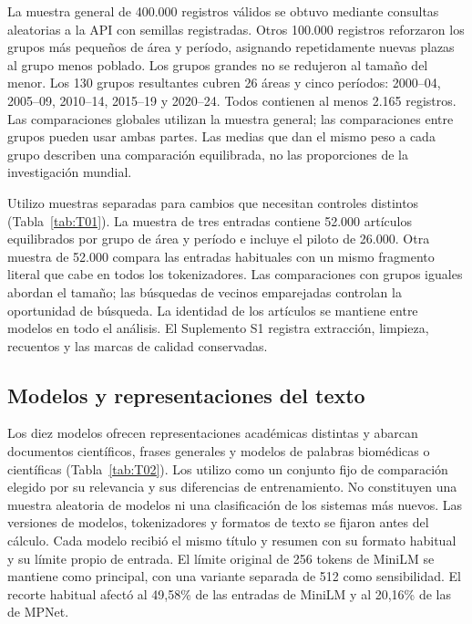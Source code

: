 \documentclass[12pt]{article}
\begin{document}
La muestra general de 400.000 registros válidos se obtuvo mediante consultas aleatorias a la API con semillas registradas. Otros 100.000 registros reforzaron los grupos más pequeños de área y período, asignando repetidamente nuevas plazas al grupo menos poblado. Los grupos grandes no se redujeron al tamaño del menor. Los 130 grupos resultantes cubren 26 áreas y cinco períodos: 2000--04, 2005--09, 2010--14, 2015--19 y 2020--24. Todos contienen al menos 2.165 registros. Las comparaciones globales utilizan la muestra general; las comparaciones entre grupos pueden usar ambas partes. Las medias que dan el mismo peso a cada grupo describen una comparación equilibrada, no las proporciones de la investigación mundial.

Utilizo muestras separadas para cambios que necesitan controles distintos (Tabla~\ref{tab:T01}). La muestra de tres entradas contiene 52.000 artículos equilibrados por grupo de área y período e incluye el piloto de 26.000. Otra muestra de 52.000 compara las entradas habituales con un mismo fragmento literal que cabe en todos los tokenizadores. Las comparaciones con grupos iguales abordan el tamaño; las búsquedas de vecinos emparejadas controlan la oportunidad de búsqueda. La identidad de los artículos se mantiene entre modelos en todo el análisis. El Suplemento S1 registra extracción, limpieza, recuentos y las marcas de calidad conservadas.


\subsection{Modelos y representaciones del texto}
Los diez modelos ofrecen representaciones académicas distintas y abarcan documentos científicos, frases generales y modelos de palabras biomédicas o científicas (Tabla~\ref{tab:T02}). Los utilizo como un conjunto fijo de comparación elegido por su relevancia y sus diferencias de entrenamiento. No constituyen una muestra aleatoria de modelos ni una clasificación de los sistemas más nuevos. Las versiones de modelos, tokenizadores y formatos de texto se fijaron antes del cálculo. Cada modelo recibió el mismo título y resumen con su formato habitual y su límite propio de entrada. El límite original de 256 tokens de MiniLM se mantiene como principal, con una variante separada de 512 como sensibilidad. El recorte habitual afectó al 49,58\% de las entradas de MiniLM y al 20,16\% de las de MPNet.
\end{document}
